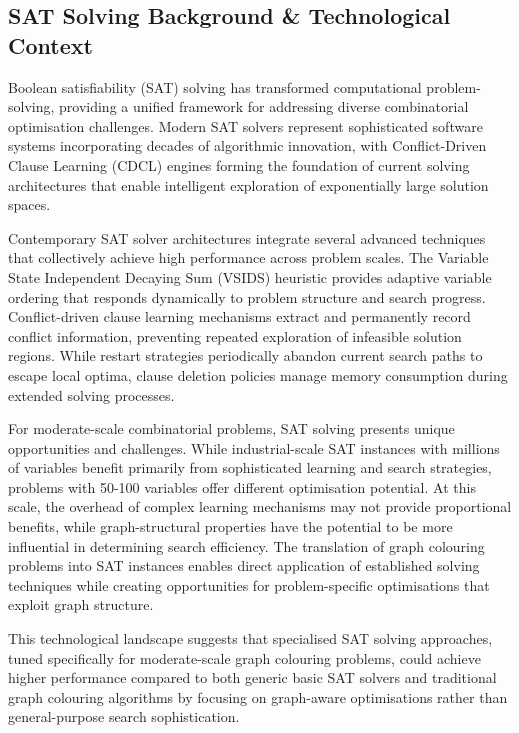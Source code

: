 \subsection{SAT Solving Background \& Technological Context}

Boolean satisfiability (SAT) solving has transformed computational problem-solving, providing a unified framework for addressing diverse combinatorial optimisation challenges. Modern SAT solvers represent sophisticated software systems incorporating decades of algorithmic innovation, with Conflict-Driven Clause Learning (CDCL) engines forming the foundation of current solving architectures that enable intelligent exploration of exponentially large solution spaces.

Contemporary SAT solver architectures integrate several advanced techniques that collectively achieve high performance across problem scales. The Variable State Independent Decaying Sum (VSIDS) heuristic provides adaptive variable ordering that responds dynamically to problem structure and search progress. Conflict-driven clause learning mechanisms extract and permanently record conflict information, preventing repeated exploration of infeasible solution regions. While restart strategies periodically abandon current search paths to escape local optima, clause deletion policies manage memory consumption during extended solving processes.

For moderate-scale combinatorial problems, SAT solving presents unique opportunities and challenges. While industrial-scale SAT instances with millions of variables benefit primarily from sophisticated learning and search strategies, problems with 50-100 variables offer different optimisation potential. At this scale, the overhead of complex learning mechanisms may not provide proportional benefits, while graph-structural properties have the potential to be more influential in determining search efficiency. The translation of graph colouring problems into SAT instances enables direct application of established solving techniques while creating opportunities for problem-specific optimisations that exploit graph structure.

This technological landscape suggests that specialised SAT solving approaches, tuned specifically for moderate-scale graph colouring problems, could achieve higher performance compared to both generic basic SAT solvers and traditional graph colouring algorithms by focusing on graph-aware optimisations rather than general-purpose search sophistication.

